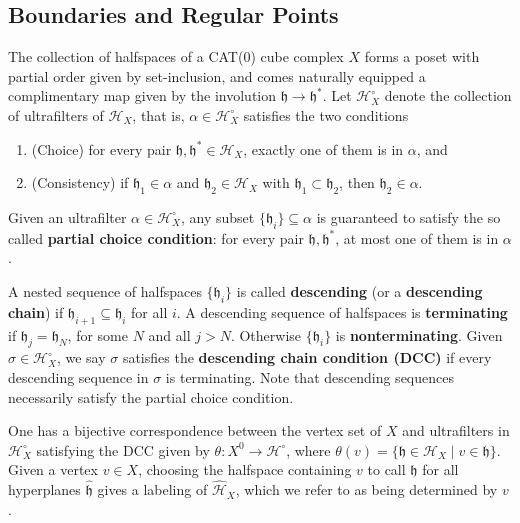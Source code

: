 \documentclass{amsart}
\theoremstyle{definition}
\newtheorem*{Notation warning}{Warning on notations}
\newtheorem*{Sketch of proof}{Sketch of proof for Theorem C}
\newcommand{\h}{{\mathfrak h}}
\newcommand{\hh}{\hat{\mathfrak h}}
\begin{document}
\begin{sloppypar}
\subsection{Boundaries and Regular Points}

The collection of halfspaces of a CAT(0) cube complex $X$ forms a poset with partial order given by set-inclusion, and comes naturally equipped a complimentary map given by the involution $\h\to\h^*$. Let $\mathcal{H}_X^\circ$ denote the collection of ultrafilters of $\mathcal{H}_X$, that is, $\alpha\in\mathcal{H}_X^\circ$ satisfies the two conditions
\begin{enumerate}
    \item (Choice) for every pair $\h,\h^*\in\mathcal{H}_X$, exactly one of them is in $\alpha$, and

    \item (Consistency) if $\h_1\in\alpha$ and $\h_2\in\mathcal{H}_X$ with $\h_1\subset\h_2$, then $\h_2\in\alpha$.
\end{enumerate}
Given an ultrafilter $\alpha\in\mathcal{H}_X^\circ$, any subset $\{\h_i\}\subseteq\alpha$ is guaranteed to satisfy the so called {\bf partial choice condition}: for every pair $\h,\h^*$, at most one of them is in $\alpha$.
\medskip

A nested sequence of halfspaces $\{\h_i\}$ is called {\bf descending} (or a {\bf descending chain}) if $\h_{i+1}\subseteq\h_{i}$ for all $i$. A descending sequence of halfspaces is {\bf terminating} if $\h_j=\h_N$, for some $N$ and all $j>N$. Otherwise $\{\h_i\}$ is {\bf nonterminating}. Given $\sigma\in\mathcal{H}_X^\circ$, we say $\sigma$ satisfies the {\bf descending chain condition (DCC)} if every descending sequence in $\sigma$ is terminating. Note that descending sequences necessarily satisfy the partial choice condition.
\medskip

One has a bijective correspondence between the vertex set of $X$ and ultrafilters in $\mathcal{H}_X^\circ$ satisfying the DCC given by $\theta:X^0\to\mathcal{H}^\circ$, where $\theta(v)=\{\h\in\mathcal{H}_X\;|\;v\in\h\}$. Given a vertex $v\in X$, choosing the halfspace containing $v$ to call $\h$ for all hyperplanes $\hh$ gives a labeling of $\hat{\mathcal{H}}_X$, which we refer to as being determined by $v$.
\medskip


\end{sloppypar}
\end{document}
